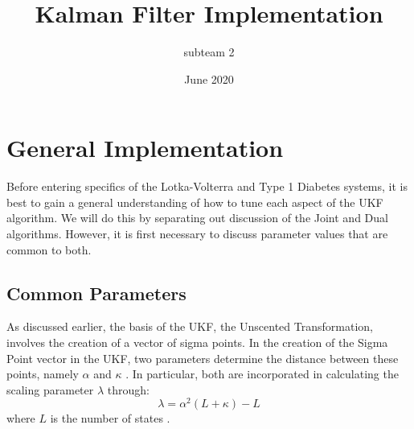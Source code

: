 \documentclass{article}
\title{Kalman Filter Implementation}
\author{subteam 2}
\date{June 2020}
\begin{document}
\maketitle

\section{General Implementation}
Before entering specifics of the Lotka-Volterra and Type 1 Diabetes systems, it is best to gain a general understanding of how to tune each aspect of the UKF algorithm. We will do this by separating out discussion of the Joint and Dual algorithms. However, it is first necessary to discuss parameter values that are common to both.

\subsection{Common Parameters}
As discussed earlier, the basis of the UKF, the Unscented Transformation, involves the creation of a vector of sigma points. In the creation of the Sigma Point vector in the UKF, two parameters determine the distance between these points, namely $\alpha$ and $\kappa$ \cite{VanMereChapter}. In particular, both are incorporated in calculating the scaling parameter $\lambda$ through:
\begin{equation}
\lambda = \alpha^2 (L + \kappa) - L
\end{equation}
where $L$ is the number of states \cite{VanMereChapter}.\\
\\
\end{document}
